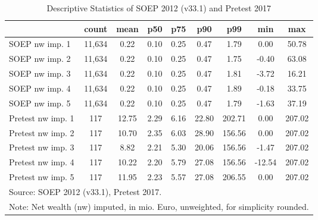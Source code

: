 \begin{table}[htbp]\centering
\def\sym#1{\ifmmode^{#1}\else\(^{#1}\)\fi}
\caption{Descriptive Statistics of SOEP 2012 (v33.1) and Pretest 2017}
\begin{tabular}{l*{1}{cccccccc}}
\hline\hline
                                            &       count&        mean&         p50&         p75&         p90&         p99&         min&         max\\
\hline
SOEP nw imp. 1                              &      11,634&        0.22&        0.10&        0.25&        0.47&        1.79&        0.00&       50.78\\
SOEP nw imp. 2                              &      11,634&        0.22&        0.10&        0.25&        0.47&        1.75&       -0.40&       63.08\\
SOEP nw imp. 3                              &      11,634&        0.22&        0.10&        0.25&        0.47&        1.81&       -3.72&       16.21\\
SOEP nw imp. 4                              &      11,634&        0.22&        0.10&        0.25&        0.47&        1.89&       -0.18&       33.75\\
SOEP nw imp. 5                              &      11,634&        0.22&        0.10&        0.25&        0.47&        1.79&       -1.63&       37.19\\
Pretest nw imp. 1                           &         117&       12.75&        2.29&        6.16&       22.80&      202.71&        0.00&      207.02\\
Pretest nw imp. 2                           &         117&       10.70&        2.35&        6.03&       28.90&      156.56&        0.00&      207.02\\
Pretest nw imp. 3                           &         117&        8.82&        2.21&        5.30&       20.06&      156.56&       -1.47&      207.02\\
Pretest nw imp. 4                           &         117&       10.22&        2.20&        5.79&       27.08&      156.56&      -12.54&      207.02\\
Pretest nw imp. 5                           &         117&       11.95&        2.23&        5.57&       27.08&      206.55&        0.00&      207.02\\
\hline\hline
\multicolumn{9}{l}{\footnotesize Source: SOEP 2012 (v33.1), Pretest 2017.}\\
\multicolumn{9}{l}{\footnotesize Note: Net wealth (nw) imputed, in mio. Euro, unweighted, for simplicity rounded.}\\
\end{tabular}
\end{table}
